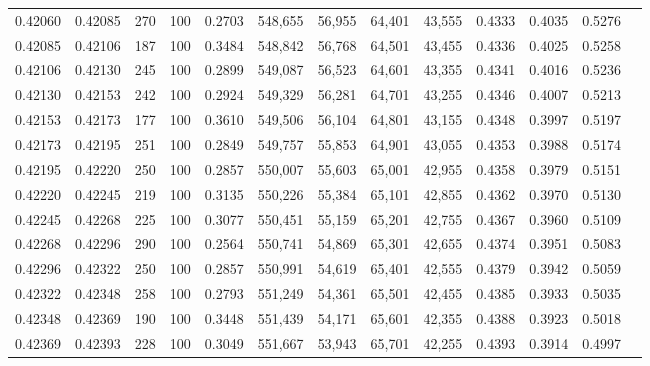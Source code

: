 \begin{tabular}{rrrrrrrrrrrrr}
0.42060 & 0.42085 &    270 & 100 &                                     0.2703 & 548,655 &  56,955 &  64,401 &  43,555 & 0.4333 & 0.4035 & 0.5276 \\
0.42085 & 0.42106 &    187 & 100 &                                     0.3484 & 548,842 &  56,768 &  64,501 &  43,455 & 0.4336 & 0.4025 & 0.5258 \\
0.42106 & 0.42130 &    245 & 100 &                                     0.2899 & 549,087 &  56,523 &  64,601 &  43,355 & 0.4341 & 0.4016 & 0.5236 \\
0.42130 & 0.42153 &    242 & 100 &                                     0.2924 & 549,329 &  56,281 &  64,701 &  43,255 & 0.4346 & 0.4007 & 0.5213 \\
0.42153 & 0.42173 &    177 & 100 &                                     0.3610 & 549,506 &  56,104 &  64,801 &  43,155 & 0.4348 & 0.3997 & 0.5197 \\
0.42173 & 0.42195 &    251 & 100 &                                     0.2849 & 549,757 &  55,853 &  64,901 &  43,055 & 0.4353 & 0.3988 & 0.5174 \\
0.42195 & 0.42220 &    250 & 100 &                                     0.2857 & 550,007 &  55,603 &  65,001 &  42,955 & 0.4358 & 0.3979 & 0.5151 \\
0.42220 & 0.42245 &    219 & 100 &                                     0.3135 & 550,226 &  55,384 &  65,101 &  42,855 & 0.4362 & 0.3970 & 0.5130 \\
0.42245 & 0.42268 &    225 & 100 &                                     0.3077 & 550,451 &  55,159 &  65,201 &  42,755 & 0.4367 & 0.3960 & 0.5109 \\
0.42268 & 0.42296 &    290 & 100 &                                     0.2564 & 550,741 &  54,869 &  65,301 &  42,655 & 0.4374 & 0.3951 & 0.5083 \\
0.42296 & 0.42322 &    250 & 100 &                                     0.2857 & 550,991 &  54,619 &  65,401 &  42,555 & 0.4379 & 0.3942 & 0.5059 \\
0.42322 & 0.42348 &    258 & 100 &                                     0.2793 & 551,249 &  54,361 &  65,501 &  42,455 & 0.4385 & 0.3933 & 0.5035 \\
0.42348 & 0.42369 &    190 & 100 &                                     0.3448 & 551,439 &  54,171 &  65,601 &  42,355 & 0.4388 & 0.3923 & 0.5018 \\
0.42369 & 0.42393 &    228 & 100 &                                     0.3049 & 551,667 &  53,943 &  65,701 &  42,255 & 0.4393 & 0.3914 & 0.4997 \\

\end{tabular}
